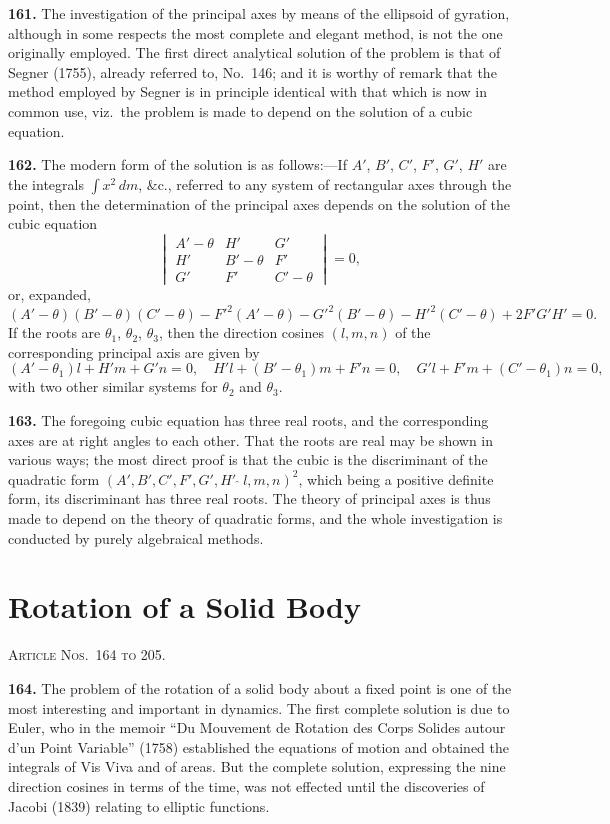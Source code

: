 \documentclass[11pt,a4paper]{book}
\begin{document}
\textbf{161.} The investigation of the principal axes by means of the ellipsoid of gyration, although in some respects the most complete and elegant method, is not the one originally employed. The first direct analytical solution of the problem is that of Segner (1755), already referred to, No.~146; and it is worthy of remark that the method employed by Segner is in principle identical with that which is now in common use, viz.\ the problem is made to depend on the solution of a cubic equation.

\textbf{162.} The modern form of the solution is as follows:---If $A'$, $B'$, $C'$, $F'$, $G'$, $H'$ are the integrals $\int x^2\,dm$, \&c., referred to any system of rectangular axes through the point, then the determination of the principal axes depends on the solution of the cubic equation
\[
\begin{vmatrix}
A' - \theta & H' & G' \\
H' & B' - \theta & F' \\
G' & F' & C' - \theta
\end{vmatrix} = 0,
\]
or, expanded,
\[
(A' - \theta)(B' - \theta)(C' - \theta) - F'^2(A' - \theta) - G'^2(B' - \theta) - H'^2(C' - \theta) + 2F'G'H' = 0.
\]
If the roots are $\theta_1$, $\theta_2$, $\theta_3$, then the direction cosines $(l, m, n)$ of the corresponding principal axis are given by
\[
(A' - \theta_1)l + H'm + G'n = 0, \quad H'l + (B' - \theta_1)m + F'n = 0, \quad G'l + F'm + (C' - \theta_1)n = 0,
\]
with two other similar systems for $\theta_2$ and $\theta_3$.

\textbf{163.} The foregoing cubic equation has three real roots, and the corresponding axes are at right angles to each other. That the roots are real may be shown in various ways; the most direct proof is that the cubic is the discriminant of the quadratic form $(A', B', C', F', G', H'\,\widehat{\,}\,l, m, n)^2$, which being a positive definite form, its discriminant has three real roots. The theory of principal axes is thus made to depend on the theory of quadratic forms, and the whole investigation is conducted by purely algebraical methods.


\section*{Rotation of a Solid Body}
\noindent\textsc{Article Nos.~164 to 205.}

\medskip

\textbf{164.} The problem of the rotation of a solid body about a fixed point is one of the most interesting and important in dynamics. The first complete solution is due to Euler, who in the memoir ``Du Mouvement de Rotation des Corps Solides autour d'un Point Variable'' (1758) established the equations of motion and obtained the integrals of Vis Viva and of areas. But the complete solution, expressing the nine direction cosines in terms of the time, was not effected until the discoveries of Jacobi (1839) relating to elliptic functions.
\end{document}
